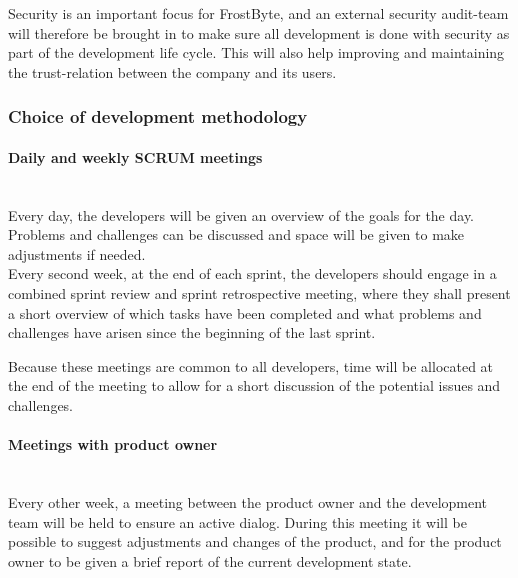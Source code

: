 Security is an important focus for FrostByte, and an external security audit-team will therefore be brought in to make sure all development is done with security as part of the development life cycle. This will also help improving and maintaining the trust-relation between the company and its users.

\subsubsection{Choice of development methodology}
\paragraph{Daily and weekly SCRUM meetings}~\\
Every day, the developers will be given an overview of the goals for the day. Problems and challenges can be discussed and space will be given to make adjustments if needed.~\\

Every second week, at the end of each sprint, the developers should engage in a combined sprint review and sprint retrospective meeting, where they shall present a short overview of which tasks have been completed and what problems and challenges have arisen since the beginning of the last sprint.

Because these meetings are common to all developers, time will be allocated at the end of the meeting to allow for a short discussion of the potential issues and challenges.

\paragraph{Meetings with product owner}~\\
Every other week, a meeting between the product owner and the development team will be held to ensure an active dialog. During this meeting it will be possible to suggest adjustments and changes of the product, and for the product owner to be given a brief report of the current development state.

